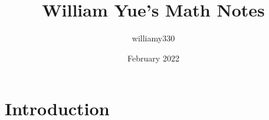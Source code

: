 \documentclass{article}
\title{William Yue's Math Notes}
\author{williamy330 }
\date{February 2022}
\begin{document}
\maketitle

\section{Introduction}
\end{document}
